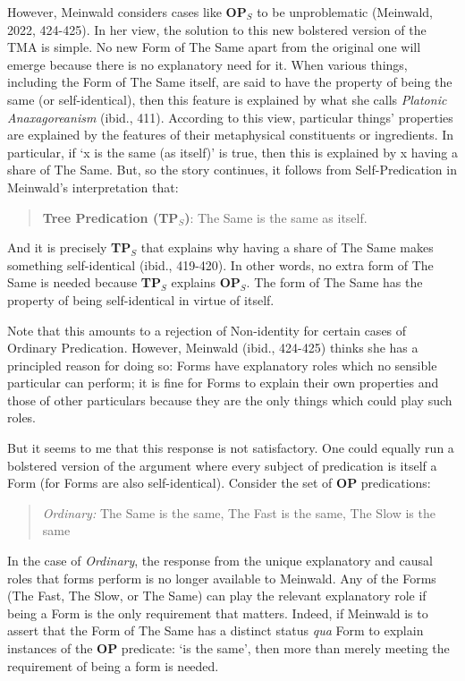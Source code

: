 \documentclass [article] {memoir}
\begin{document}
However, Meinwald considers cases like \textbf{OP$_S$} to be unproblematic (Meinwald, 2022, 424-425). In her view, the solution to this new bolstered version of the TMA is simple. No new Form of The Same apart from the original one will emerge because there is no explanatory need for it. When various things, including the Form of The Same itself, are said to have the property of being the same (or self-identical), then this feature is explained by what she calls \textit{Platonic Anaxagoreanism} (ibid., 411). According to this view, particular things' properties are explained by the features of their metaphysical constituents or ingredients. In particular, if `x is the same (as itself)' is true, then this is explained by x having a share of The Same. But, so the story continues, it follows from Self-Predication in Meinwald's interpretation that:
\begin{quote}
\textbf{Tree Predication (TP$_S$)}: The Same is the same as itself.
\end{quote}
And it is precisely \textbf{TP$_S$} that explains why having a share of The Same makes something self-identical (ibid., 419-420). In other words, no extra form of The Same is needed because \textbf{TP$_S$} explains \textbf{OP$_S$}. The form of The Same has the property of being self-identical in virtue of itself. 

Note that this amounts to a rejection of Non-identity for certain cases of Ordinary Predication. However, Meinwald (ibid., 424-425) thinks she has a principled reason for doing so: Forms have explanatory roles which no sensible particular can perform; it is fine for Forms to explain their own properties and those of other particulars because they are the only things which could play such roles.

But it seems to me that this response is not satisfactory. One could equally run a bolstered version of the argument where every subject of predication is itself a Form (for Forms are also self-identical). Consider the set of \textbf{OP} predications: 
\begin{quote}
\textit{Ordinary:} The Same is the same, The Fast is the same, The Slow is the same
\end{quote}

In the case of \textit{Ordinary}, the response from the unique explanatory and causal roles that forms perform is no longer available to Meinwald. Any of the Forms (The Fast, The Slow, or The Same) can play the relevant explanatory role if being a Form is the only requirement that matters. Indeed, if Meinwald is to assert that the Form of The Same has a distinct status \textit{qua} Form to explain instances of the \textbf{OP} predicate: `is the same', then more than merely meeting the requirement of being a form is needed. 
\end{document}

